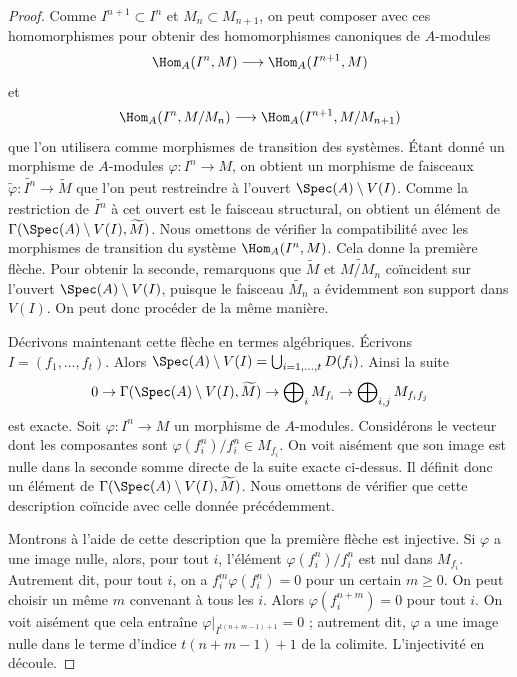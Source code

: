\begin{proof}
Comme $I^{n + 1} \subset I^n$ et $M_n \subset M_{n + 1}$, on peut
composer avec ces homomorphismes pour obtenir des homomorphismes canoniques de $A$-modules
$$
\Hom_A(I^n, M)
\longrightarrow
\Hom_A(I^{n + 1}, M)
$$
et
$$
\Hom_A(I^n, M/M_n)
\longrightarrow
\Hom_A(I^{n + 1}, M/M_{n + 1})
$$
que l'on utilisera comme morphismes de transition des systèmes. Étant donné un morphisme de
$A$-modules $\varphi : I^n \to M$, on obtient un morphisme de
faisceaux $\widetilde{\varphi} : \widetilde{I^n} \to \widetilde{M}$
que l'on peut restreindre à l'ouvert $\Spec(A) \setminus V(I)$.
Comme la restriction de $\widetilde{I^n}$ à cet ouvert est le faisceau
structural, on obtient un élément de
$\Gamma(\Spec(A) \setminus V(I), \widetilde{M})$.
Nous omettons de vérifier la compatibilité avec les morphismes de transition
du système $\Hom_A(I^n, M)$. Cela donne la première flèche.
Pour obtenir la seconde, remarquons que
$\widetilde{M}$ et $\widetilde{M/M_n}$ coïncident sur l'ouvert
$\Spec(A) \setminus V(I)$, puisque le faisceau $\widetilde{M_n}$
a évidemment son support dans $V(I)$. On peut donc procéder
de la même manière.

\medskip\noindent
Décrivons maintenant cette flèche en termes algébriques.
Écrivons $I = (f_1, \ldots, f_t)$. Alors
$\Spec(A) \setminus V(I) = \bigcup_{i = 1, \ldots, t} D(f_i)$.
Ainsi la suite
$$
0 \to
\Gamma(\Spec(A) \setminus V(I), \widetilde{M}) \to
\bigoplus\nolimits_i M_{f_i} \to
\bigoplus\nolimits_{i, j} M_{f_if_j}
$$
est exacte. Soit $\varphi : I^n \to M$ un morphisme de $A$-modules.
Considérons le vecteur dont les composantes sont $\varphi(f_i^n)/f_i^n \in M_{f_i}$.
On voit aisément que son image est nulle dans la
seconde somme directe de la suite exacte ci-dessus. Il définit donc un élément
de $\Gamma(\Spec(A) \setminus V(I), \widetilde{M})$.
Nous omettons de vérifier que cette description coïncide avec celle
donnée précédemment.

\medskip\noindent
Montrons à l'aide de cette description que la première flèche est injective.
Si $\varphi$ a une image nulle, alors, pour tout $i$, l'élément
$\varphi(f_i^n)/f_i^n$ est nul dans $M_{f_i}$. Autrement dit,
pour tout $i$, on a $f_i^m\varphi(f_i^n) = 0$ pour un certain $m \geq 0$.
On peut choisir un même $m$ convenant à tous les $i$. Alors
$\varphi(f_i^{n + m}) = 0$ pour tout $i$. On voit aisément que
cela entraîne $\varphi|_{I^{t(n + m - 1) + 1}} = 0$ ; autrement
dit, $\varphi$ a une image nulle dans le terme d'indice $t(n + m - 1) + 1$
de la colimite. L'injectivité en découle.


\end{proof}
